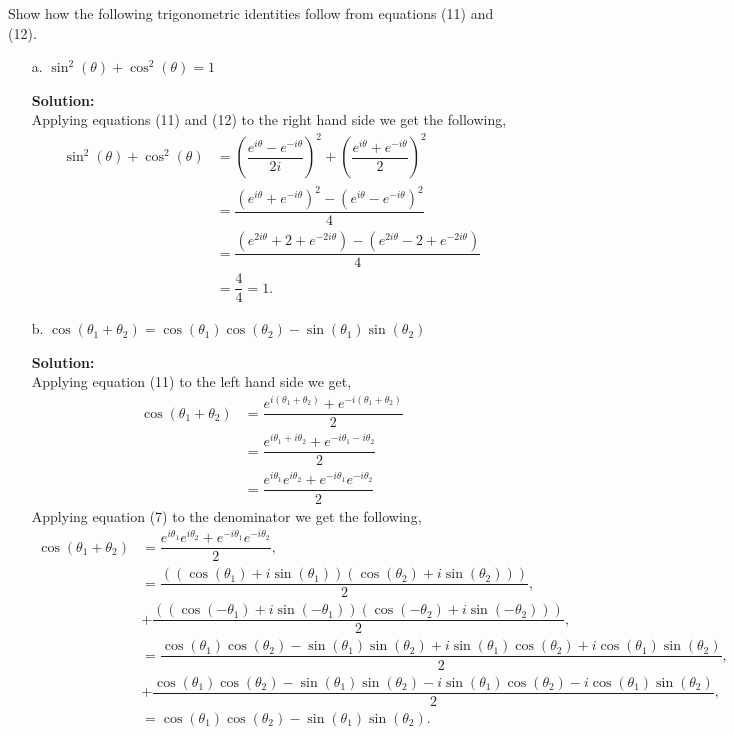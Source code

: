 \documentclass[12pt]{article}
\makeatletter
\theoremstyle{homework}
\newenvironment{exercise}[1]
{\def\@currentlabel{#1}\exercisecore}
{\endexercisecore}
\newcommand{\localhead}[1]{\par\smallskip\noindent\textbf{#1}\nobreak\\}%
\newcommand\solution{\localhead{Solution:}}
\makeatother
\begin{document}
\begin{exercise}{13} Show how the following trigonometric identities follow from equations (11) and (12).\\
    \begin{enumerate}
        \item[a.] $\sin^2(\theta) + \cos^2(\theta) = 1$\\
        \solution Applying equations (11) and (12) to the right hand side we get the following,
        \begin{align*}
            \sin^2(\theta) + \cos^2(\theta) &= \left(\dfrac{e^{i\theta} - e^{-i\theta}}{2i}\right)^2 + \left(\dfrac{e^{i\theta} + e^{-i\theta}}{2}\right)^2\\
             &= \dfrac{(e^{i\theta} + e^{-i\theta})^2 - (e^{i\theta} - e^{-i\theta})^2}{4}\\
             &= \dfrac{(e^{2i\theta}+2+e^{-2i\theta}) - (e^{2i\theta}-2+e^{-2i\theta})}{4}\\
             &= \dfrac{4}{4} = 1.
        \end{align*} 
        \item[b.] $\cos(\theta_1 + \theta_2) = \cos(\theta_1)\cos(\theta_2) - \sin(\theta_1)\sin(\theta_2)$\\ 
        \solution Applying equation (11) to the left hand side we get, 
        \begin{align*}
            \cos(\theta_1 + \theta_2) &= \dfrac{e^{i(\theta_1 + \theta_2)} + e^{-i(\theta_1 + \theta_2)}}{2}\\
            &=\dfrac{e^{i\theta_1 + i\theta_2} + e^{-i\theta_1 - i\theta_2}}{2}\\
            &=\dfrac{e^{i\theta_1}e^{i\theta_2} + e^{-i\theta_1} e^{-i\theta_2}}{2}
        \end{align*}
        Applying equation (7) to the denominator we get the following, 
        \begin{align*}
            \cos(\theta_1 + \theta_2) &= \dfrac{e^{i\theta_1}e^{i\theta_2} + e^{-i\theta_1} e^{-i\theta_2}}{2},\\
            &=\dfrac{((\cos(\theta_1) + i\sin(\theta_1))(\cos(\theta_2) + i\sin(\theta_2)))}{2},\\ 
            &+ \dfrac{((\cos(-\theta_1) + i\sin(-\theta_1))(\cos(-\theta_2) + i\sin(-\theta_2)))}{2},\\
            &= \dfrac{\cos(\theta_1)\cos(\theta_2) - \sin(\theta_1)\sin(\theta_2) + i\sin(\theta_1)\cos(\theta_2) + i\cos(\theta_1)\sin(\theta_2)}{2},\\
            &+ \dfrac{\cos(\theta_1)\cos(\theta_2) - \sin(\theta_1)\sin(\theta_2) - i\sin(\theta_1)\cos(\theta_2) - i\cos(\theta_1)\sin(\theta_2)}{2},\\
            &=  \cos(\theta_1)\cos(\theta_2) - \sin(\theta_1)\sin(\theta_2).
        \end{align*}
    \end{enumerate}
\end{exercise}
\vspace{.15in}
\end{document}
